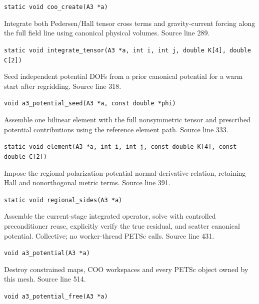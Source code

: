 \begin{description}[style=nextline,leftmargin=0pt,labelindent=0pt,labelwidth=0pt,labelsep=0pt]
{\small\nolinkurl{static void coo_create(A3 *a)}}
\item[\texttt{integrate\_tensor}] Integrate both Pedersen/Hall tensor cross terms and gravity-current forcing along the full field line using canonical physical volumes. Source line 289.\par
{\small\nolinkurl{static void integrate_tensor(A3 *a, int i, int j, double K[4], double C[2])}}
\item[\texttt{a3\_potential\_seed}] Seed independent potential DOFs from a prior canonical potential for a warm start after regridding. Source line 318.\par
{\small\nolinkurl{void a3_potential_seed(A3 *a, const double *phi)}}
\item[\texttt{element}] Assemble one bilinear element with the full nonsymmetric tensor and prescribed potential contributions using the reference element path. Source line 333.\par
{\small\nolinkurl{static void element(A3 *a, int i, int j, const double K[4], const double C[2])}}
\item[\texttt{regional\_sides}] Impose the regional polarization-potential normal-derivative relation, retaining Hall and nonorthogonal metric terms. Source line 391.\par
{\small\nolinkurl{static void regional_sides(A3 *a)}}
\item[\texttt{a3\_potential}] Assemble the current-stage integrated operator, solve with controlled preconditioner reuse, explicitly verify the true residual, and scatter canonical potential. Collective; no worker-thread PETSc calls. Source line 431.\par
{\small\nolinkurl{void a3_potential(A3 *a)}}
\item[\texttt{a3\_potential\_free}] Destroy constrained maps, COO workspaces and every PETSc object owned by this mesh. Source line 514.\par
{\small\nolinkurl{void a3_potential_free(A3 *a)}}
\end{description}
